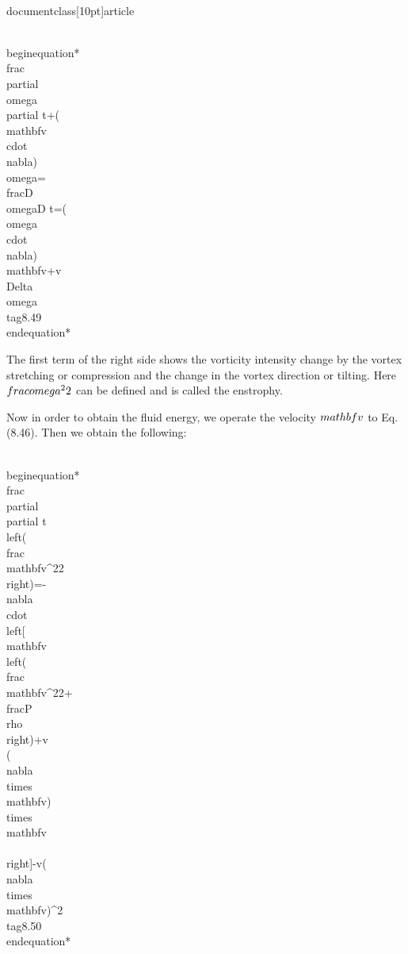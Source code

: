 \\documentclass[10pt]{article}
\begin{document}
{{{{{\\begin{equation*}
\\frac{\\partial \\omega}{\\partial t}+(\\mathbf{v} \\cdot \\nabla) \\omega=\\frac{D \\omega}{D t}=(\\omega \\cdot \\nabla) \\mathbf{v}+v \\Delta \\omega \\tag{8.49}
\\end{equation*}


The first term of the right side shows the vorticity intensity change by the vortex stretching or compression and the change in the vortex direction or tilting. Here $\\frac{\\omega^{2}}{2}$ can be defined and is called the enstrophy.

Now in order to obtain the fluid energy, we operate the velocity $\\mathbf{v}$ to Eq. (8.46). Then we obtain the following:


\\begin{equation*}
\\frac{\\partial}{\\partial t}\\left(\\frac{\\mathbf{v}^{2}}{2}\\right)=-\\nabla \\cdot\\left[\\mathbf{v}\\left(\\frac{\\mathbf{v}^{2}}{2}+\\frac{P}{\\rho}\\right)+v\\{(\\nabla \\times \\mathbf{v}) \\times \\mathbf{v}\\}\\right]-v(\\nabla \\times \\mathbf{v})^{2} \\tag{8.50}
\\end{equation*}


}}}}}
\end{document}
